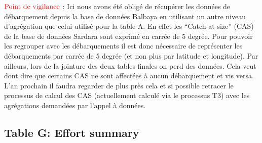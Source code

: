 \documentclass[]{article}
\begin{document}
\textbf{\(\color{red}{\text{Point de vigilance}}\)} : Ici nous avons été
obligé de récupérer les données de débarquement depuis la base de
données Balbaya en utilisant un autre niveau d'agrégation que celui
utilisé pour la table A. En effet les ``Catch-at-size'' (CAS) de la base
de données Sardara sont exprimé en carrée de 5 degrée. Pour pouvoir les
regrouper avec les débarquements il est donc nécessaire de représenter
les débarquements par carrée de 5 degrée (et non plus par latitude et
longitude). Par ailleurs, lors de la jointure des deux tables finales on
perd des données. Cela veut dont dire que certains CAS ne sont affectées
à aucun débarquement et vis versa. L'an prochain il faudra regarder de
plus près cela et si possible retracer le processus de calcul des CAS
(actuellement calculé via le processus T3) avec les agrégations
demandées par l'appel à données.

\hypertarget{table-g-effort-summary}{%
\subsection{Table G: Effort summary}\label{table-g-effort-summary}}
\end{document}
